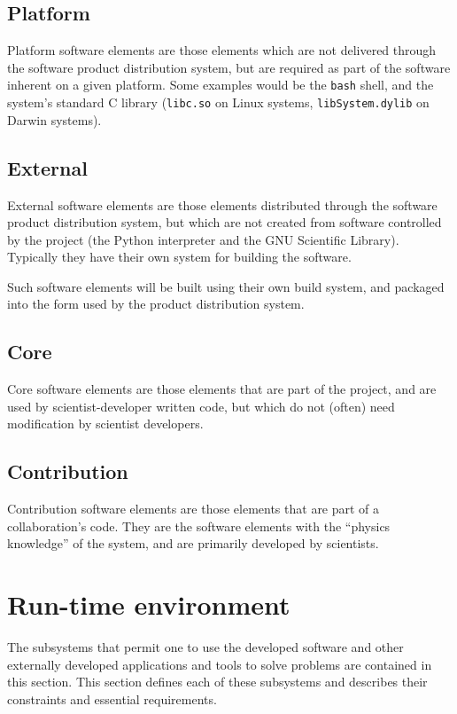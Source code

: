 \documentclass[draftmode,draftwater]{memarticle}
\newcommand{\prog}[1]%
  {\texttt{#1}}
\begin{document}
\subsection{Platform}

Platform software elements are those elements which are not delivered
through the software product distribution system, but are required as
part of the software inherent on a given platform. Some examples would
be the \prog{bash} shell, and the system's standard C library
(\prog{libc.so} on Linux systems, \prog{libSystem.dylib} on Darwin
systems).

\subsection{External}

External software elements are those elements distributed through the
software product distribution system, but which are not created from
software controlled by the project (\eg the Python interpreter and the
GNU Scientific Library). Typically they have their own system for
building the software.

Such software elements will be built using their own build system, and
packaged into the form used by the product distribution system.

\subsection{Core}

Core software elements are those elements that are part of the project,
and are used by scientist-developer written code, but which do not
(often) need modification by scientist developers.

\subsection{Contribution}

Contribution software elements are those elements that are part of a
collaboration's code. They are the software elements with the ``physics
knowledge'' of the system, and are primarily developed by scientists.

\section{Run-time environment}

The subsystems that permit one to use the developed software and other
externally developed applications and tools to solve problems are
contained in this section. This section defines each of these subsystems
and describes their constraints and essential requirements.
\end{document}
